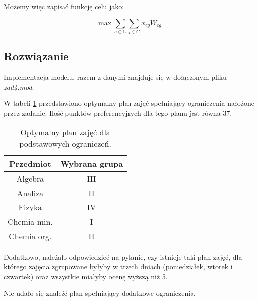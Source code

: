 \documentclass{article}
\begin{document}
        Możemy więc zapisać funkcję celu jako:

        $$\max{\sum_{c \in C} \sum_{g \in G} x_{cg} W_{cg}}$$

    \subsection{Rozwiązanie}
    
        Implementacja modelu, razem z danymi znajduje się w dołączonym pliku \textit{zad4.mod}.

        W tabeli \ref{tab5} przedstawiono optymalny plan zajęć spełniający ograniczenia 
        nałożone przez zadanie. Ilość punktów preferencyjnych dla tego planu jest 
        równa 37.

        \begin{table}[H]
            \begin{center}
                \begin{tabular}{c|c}
                    \textbf{Przedmiot} & \textbf{Wybrana grupa} \\ 
                    \hline
                    Algebra     & III \\
                    Analiza     & II \\
                    Fizyka      & IV \\
                    Chemia min. & I \\
                    Chemia org. & II 
                \end{tabular}
                \caption{Optymalny plan zajęć dla podstawowych ograniczeń.}
                \label{tab5}
            \end{center}
        \end{table}

        Dodatkowo, należało odpowiedzieć na pytanie, czy istnieje taki plan zajęć, 
        dla którego zajęcia zgrupowane byłyby w trzech dniach (poniedziałek, wtorek i czwartek) 
        oraz wszystkie miałyby ocenę wyższą niż 5.

        Nie udało się znaleźć plan spełniający dodatkowe ograniczenia.
\end{document}
